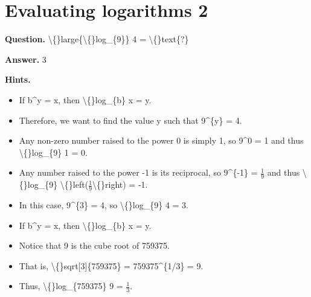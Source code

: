 \documentclass{article}
\begin{document}
\section*{Evaluating logarithms 2}
\textbf{Question.} \textbackslash\{\}large\{\textbackslash\{\}log\_\{9\}\} 4 = \textbackslash\{\}text\{?\}

\textbf{Answer.} 3

\textbf{Hints.}
\begin{itemize}
  \item If b\textasciicircum{}y = x, then \textbackslash\{\}log\_\{b\} x = y.
  \item Therefore, we want to find the value y such that 9\textasciicircum{}\{y\} = 4.
  \item Any non-zero number raised to the power 0 is simply 1, so 9\textasciicircum{}0 = 1 and thus \textbackslash\{\}log\_\{9\} 1 = 0.
  \item Any number raised to the power -1 is its reciprocal, so 9\textasciicircum{}\{-1\} = $\frac{1}{9}$ and thus \textbackslash\{\}log\_\{9\} \textbackslash\{\}left($\frac{1}{9}$\textbackslash\{\}right) = -1.
  \item In this case, 9\textasciicircum{}\{3\} = 4,
                            so \textbackslash\{\}log\_\{9\} 4 = 3.
  \item If b\textasciicircum{}y = x, then \textbackslash\{\}log\_\{b\} x = y.
  \item Notice that 9 is the cube root of 759375.
  \item That is, \textbackslash\{\}sqrt[3]\{759375\} = 759375\textasciicircum{}\{1/3\} = 9.
  \item Thus, \textbackslash\{\}log\_\{759375\} 9 = $\frac{1}{3}$.
\end{itemize}
\end{document}
